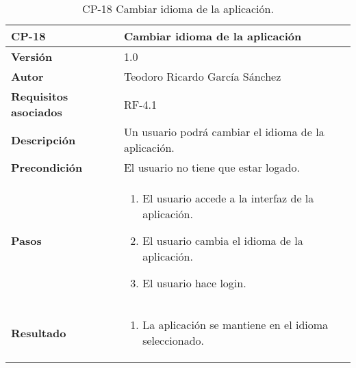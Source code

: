 \begin{table}[p]
	\centering
	\begin{tabularx}{\linewidth}{ p{} p{} }
		\toprule
		\textbf{CP-18}    & \textbf{Cambiar idioma de la aplicación}\\
		\toprule
		\textbf{Versión}              & 1.0    \\
		\textbf{Autor}                & Teodoro Ricardo García Sánchez \\
		\textbf{Requisitos asociados} & RF-4.1 \\
		\textbf{Descripción}          & Un usuario podrá cambiar el idioma de la aplicación. \\
		\textbf{Precondición}         & El usuario no tiene que estar logado. \\
		\textbf{Pasos}             &
		\begin{enumerate}
			\def\labelenumi{\arabic{enumi}.}
			\tightlist
			\item El usuario accede a la interfaz de la aplicación.
			\item El usuario cambia el idioma de la aplicación.
			\item El usuario hace login.
		\end{enumerate}\\
		\textbf{Resultado}          & 
		\begin{enumerate}
			\item La aplicación se mantiene en el idioma seleccionado.
		\end{enumerate}\\
		\bottomrule
	\end{tabularx}
	\caption{CP-18 Cambiar idioma de la aplicación.}
\end{table}

